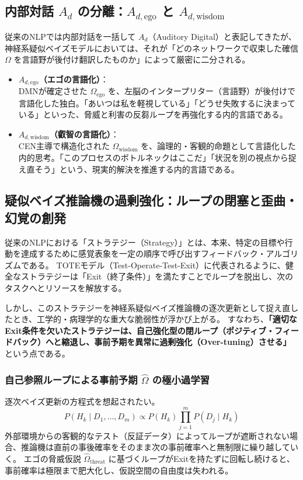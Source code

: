 \subsection{内部対話 $A_d$ の分離：$A_{d,\mathrm{ego}}$ と $A_{d,\mathrm{wisdom}}$}
従来のNLPでは内部対話を一括して $A_d$（Auditory Digital）と表記してきたが、神経系疑似ベイズモデルにおいては、それが「どのネットワークで収束した確信 $\Omega$ を言語野が後付け翻訳したものか」によって厳密に二分される。

\begin{itemize}
  \item \textbf{$A_{d,\mathrm{ego}}$（エゴの言語化）}：\\
  DMNが確定させた $\Omega_{\mathrm{ego}}$ を、左脳のインタープリター（言語野）が後付けで言語化した独白。「あいつは私を軽視している」「どうせ失敗するに決まっている」といった、脅威と利害の反芻ループを再強化する内的言語である。
  \item \textbf{$A_{d,\mathrm{wisdom}}$（叡智の言語化）}：\\
  CEN主導で構造化された $\Omega_{\mathrm{wisdom}}$ を、論理的・客観的命題として言語化した内的思考。「このプロセスのボトルネックはここだ」「状況を別の視点から捉え直そう」という、現実的解決を推進する内的言語である。
\end{itemize}



\subsection{疑似ベイズ推論機の過剰強化：ループの閉塞と歪曲・幻覚の創発}

従来のNLPにおける「ストラテジー（Strategy）」とは、本来、特定の目標や行動を達成するために感覚表象を一定の順序で呼び出すフィードバック・アルゴリズムである。
TOTEモデル（Test-Operate-Test-Exit）に代表されるように、健全なストラテジーは「Exit（終了条件）」を満たすことでループを脱出し、次のタスクへとリソースを解放する。

しかし、このストラテジーを神経系疑似ベイズ推論機の逐次更新として捉え直したとき、工学的・病理学的な重大な脆弱性が浮かび上がる。
すなわち、\textbf{「適切なExit条件を欠いたストラテジーは、自己強化型の閉ループ（ポジティブ・フィードバック）へと縮退し、事前予期を異常に過剰強化（Over-tuning）させる」}という点である。

\subsubsection{自己参照ループによる事前予期 $\hat{\Omega}$ の極小過学習}
逐次ベイズ更新の方程式を想起されたい。
\begin{equation}
    P(H_k \mid D_1, \dots, D_m) \propto P(H_k) \prod_{j=1}^m P(D_j \mid H_k)
\end{equation}
外部環境からの客観的なテスト（反証データ）によってループが遮断されない場合、推論機は直前の事後確率をそのまま次の事前確率へと無制限に繰り越していく。
エゴの脅威仮説 $\hat{\Omega}_{\mathrm{threat}}$ に基づくループがExitを持たずに回転し続けると、事前確率は極限まで肥大化し、仮説空間の自由度は失われる。


